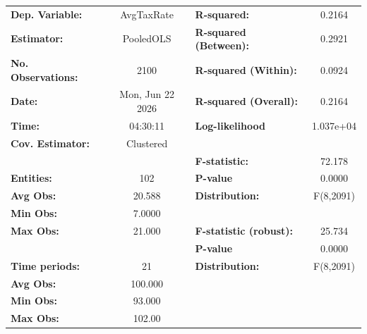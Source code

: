 \begin{center}
\begin{tabular}{lclc}
\toprule
\textbf{Dep. Variable:}                       &     AvgTaxRate     & \textbf{  R-squared:         }   &      0.2164      \\
\textbf{Estimator:}                           &     PooledOLS      & \textbf{  R-squared (Between):}  &      0.2921      \\
\textbf{No. Observations:}                    &        2100        & \textbf{  R-squared (Within):}   &      0.0924      \\
\textbf{Date:}                                &  Mon, Jun 22 2026  & \textbf{  R-squared (Overall):}  &      0.2164      \\
\textbf{Time:}                                &      04:30:11      & \textbf{  Log-likelihood     }   &    1.037e+04     \\
\textbf{Cov. Estimator:}                      &     Clustered      & \textbf{                     }   &                  \\
\textbf{}                                     &                    & \textbf{  F-statistic:       }   &      72.178      \\
\textbf{Entities:}                            &        102         & \textbf{  P-value            }   &      0.0000      \\
\textbf{Avg Obs:}                             &       20.588       & \textbf{  Distribution:      }   &    F(8,2091)     \\
\textbf{Min Obs:}                             &       7.0000       & \textbf{                     }   &                  \\
\textbf{Max Obs:}                             &       21.000       & \textbf{  F-statistic (robust):} &      25.734      \\
\textbf{}                                     &                    & \textbf{  P-value            }   &      0.0000      \\
\textbf{Time periods:}                        &         21         & \textbf{  Distribution:      }   &    F(8,2091)     \\
\textbf{Avg Obs:}                             &      100.000       & \textbf{                     }   &                  \\
\textbf{Min Obs:}                             &       93.000       & \textbf{                     }   &                  \\
\textbf{Max Obs:}                             &       102.00       & \textbf{                     }   &                  \\

\end{tabular}
\end{center}

